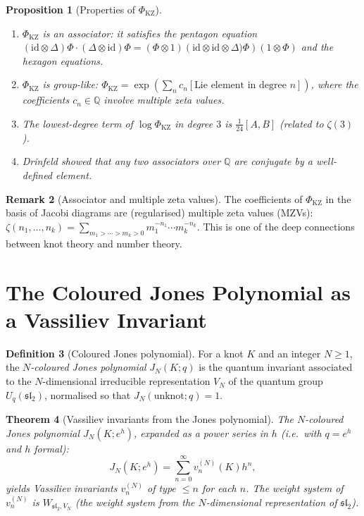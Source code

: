 \documentclass[12pt,a4paper]{amsart}
\newtheorem{theorem}{Theorem}[section]
\newtheorem{proposition}[theorem]{Proposition}
\theoremstyle{definition}
\newtheorem{definition}[theorem]{Definition}
\newtheorem{remark}[theorem]{Remark}
\newcommand{\Q}{\mathbb{Q}}
\newcommand{\id}{\mathrm{id}}
\begin{document}
\begin{proposition}[Properties of $\Phi_{\mathrm{KZ}}$]
\begin{enumerate}[label=(\roman*)]
  \item $\Phi_{\mathrm{KZ}}$ is an associator: it satisfies the pentagon
        equation
        $(\id \otimes \Delta) \Phi \cdot (\Delta \otimes \id) \Phi =
         (\Phi \otimes 1)({\id \otimes \id \otimes \Delta)}\Phi)(1 \otimes \Phi)$
        and the hexagon equations.
  \item $\Phi_{\mathrm{KZ}}$ is group-like: $\Phi_{\mathrm{KZ}} = \exp(\sum_n c_n [\text{Lie element in degree } n])$, where the coefficients $c_n \in \Q$ involve multiple zeta values.
  \item The lowest-degree term of $\log \Phi_{\mathrm{KZ}}$ in degree $3$
        is $\frac{1}{24}[A, B]$ (related to $\zeta(3)$).
  \item Drinfeld showed that any two associators over $\Q$ are conjugate
        by a well-defined element.
\end{enumerate}
\end{proposition}

\begin{remark}[Associator and multiple zeta values]
The coefficients of $\Phi_{\mathrm{KZ}}$ in the basis of Jacobi diagrams
are (regularised) multiple zeta values (MZVs):
$\zeta(n_1, \ldots, n_k) = \sum_{m_1 > \cdots > m_k > 0} m_1^{-n_1} \cdots m_k^{-n_k}$.
This is one of the deep connections between knot theory and number theory.
\end{remark}

\section{The Coloured Jones Polynomial as a Vassiliev Invariant}\label{sec:jones}

\begin{definition}[Coloured Jones polynomial]
For a knot $K$ and an integer $N \geq 1$, the \emph{$N$-coloured Jones
polynomial} $J_N(K; q)$ is the quantum invariant associated to the
$N$-dimensional irreducible representation $V_N$ of the quantum group
$U_q(\mathfrak{sl}_2)$, normalised so that $J_N(\text{unknot}; q) = 1$.
\end{definition}

\begin{theorem}[Vassiliev invariants from the Jones polynomial]
\label{thm:jones_vassiliev}
The $N$-coloured Jones polynomial $J_N(K;e^h)$, expanded as a power series
in $h$ (i.e.\ with $q = e^h$ and $h$ formal):
\[
  J_N(K; e^h) = \sum_{n=0}^\infty v_n^{(N)}(K) h^n,
\]
yields Vassiliev invariants $v_n^{(N)}$ of type $\leq n$ for each $n$.
The weight system of $v_n^{(N)}$ is $W_{\mathfrak{sl}_2, V_N}$
(the weight system from the $N$-dimensional representation of $\mathfrak{sl}_2$).
\end{theorem}
\end{document}
